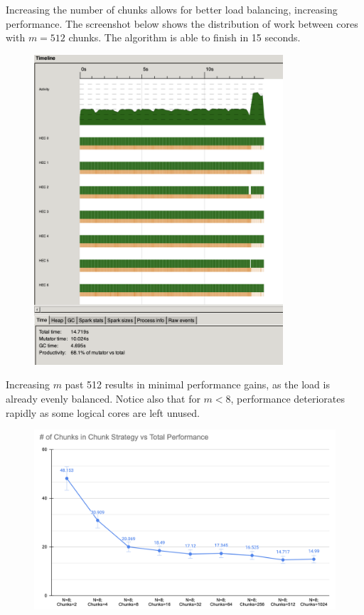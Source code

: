 \documentclass{article}
\begin{document}
Increasing the number of chunks allows for better load balancing, increasing performance. The screenshot below shows the distribution of work between cores with $m=512$ chunks. The algorithm is able to finish in 15 seconds.
\begin{figure}[H]
	\centering
	\includegraphics[width=25em]{../images/512_sc.png}
\end{figure}

Increasing $m$ past 512 results in minimal performance gains, as the load is already evenly balanced. Notice also that for $m<8$, performance deteriorates rapidly as some logical cores are left unused.
\begin{figure}[H]
	\centering
	\includegraphics[width=40em]{../images/line_sc.png}
\end{figure}
\end{document}
